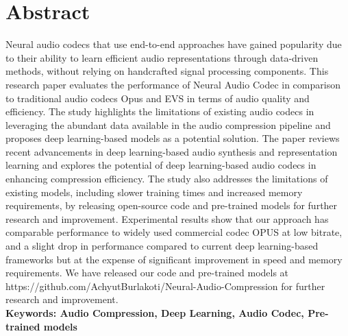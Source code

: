 \documentclass[12pt]{report}
\begin{document}
\chapter*{Abstract}
Neural audio codecs that use end-to-end approaches have gained popularity due to their ability to learn efficient audio representations through data-driven methods, without relying on handcrafted signal processing components. This research paper evaluates the performance of Neural Audio Codec in comparison to traditional audio codecs Opus and EVS in terms of audio quality and efficiency. The study highlights the limitations of existing audio codecs in leveraging the abundant data available in the audio compression pipeline and proposes deep learning-based models as a potential solution. The paper reviews recent advancements in deep learning-based audio synthesis and representation learning and explores the potential of deep learning-based audio codecs in enhancing compression efficiency. The study also addresses the limitations of existing models, including slower training times and increased memory requirements, by releasing open-source code and pre-trained models for further research and improvement. Experimental results show that our approach has comparable performance to widely used commercial codec OPUS at low bitrate, and a slight drop in performance compared to current deep learning-based frameworks but at the expense of significant improvement in speed and memory requirements. We have released our code and pre-trained models at https://github.com/AchyutBurlakoti/Neural-Audio-Compression for further research and improvement.  \\
\newline
\textbf{Keywords: Audio Compression, Deep Learning, Audio Codec, Pre-trained models}
\tableofcontents
{}
\listoffigures
{}
\listoftables
{}
\end{document}
